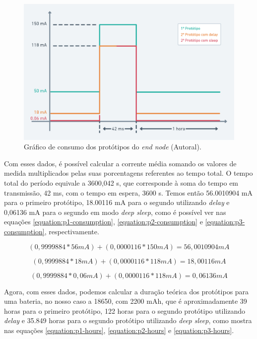 \begin{figure}[H]
  \centering
  \includegraphics[width=.80\textwidth]{assets/end-node-consumption-chart.png} 
  \caption{Gráfico de consumo dos protótipos do \textit{end node} (Autoral).}
  \label{fig:end-node-consumption-chart} 
\end{figure}

Com esses dados, é possível calcular a corrente média somando os valores de medida multiplicados pelas suas porcentagens referentes ao tempo total. O tempo total do período equivale a 3600,042 s, que corresponde à soma do tempo em transmissão, 42 ms, com o tempo em espera, 3600 s. Temos então 56.0010904 mA para o primeiro protótipo, 18.00116 mA para o segundo utilizando \textit{delay} e 0,06136 mA para o segundo em modo \textit{deep sleep}, como é possível ver nas equações \ref{equation:p1-consumption}, \ref{equation:p2-consumption} e \ref{equation:p3-consumption}, respectivamente.

\begin{equation}
  (0,9999884 * 56 mA) + (0,0000116 * 150 mA) = 56,0010904 mA
  \label{equation:p1-consumption} 
\end{equation}

\begin{equation}
  (0,9999884 * 18 mA) + (0,0000116 * 118 mA) = 18,00116 mA
  \label{equation:p2-consumption} 
\end{equation}

\begin{equation}
  (0,9999884 * 0,06 mA) + (0,0000116 * 118 mA) = 0,06136 mA
  \label{equation:p3-consumption} 
\end{equation}

Agora, com esses dados, podemos calcular a duração teórica dos protótipos  para uma bateria, no nosso caso a 18650, com 2200 mAh, que é aproximadamente 39 horas para o primeiro protótipo, 122 horas para o segundo protótipo utilizando \textit{delay} e 35.849 horas para o segundo protótipo utilizando \textit{deep sleep}, como mostra nas equações \ref{equation:p1-hours}, \ref{equation:p2-hours} e \ref{equation:p3-hours}.

